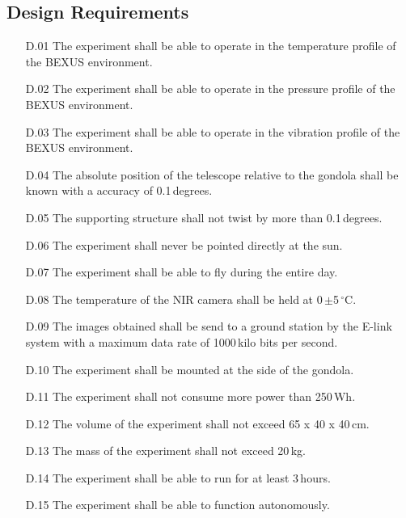 \subsection{Design Requirements}

\begin{enumerate}
	\item[D.01] The experiment shall be able to operate in the temperature profile of the BEXUS environment.
	\item[D.02] The experiment shall be able to operate in the pressure profile of the BEXUS environment.
    \item[D.03] The experiment shall be able to operate in the vibration profile of the BEXUS environment.
    \item[D.04] The absolute position of the telescope relative to the gondola shall be known with a accuracy of 0.1\,degrees.
	\item[D.05] The supporting structure shall not twist by more than 0.1\,degrees.
	\item[D.06] The experiment shall never be pointed directly at the sun.
	\item[D.07] The experiment shall be able to fly during the entire day.
	\item[D.08] The temperature of the NIR camera shall be held at 0\,$\pm$5\,$^\circ$C.
	\item[D.09] The images obtained shall be send to a ground station by the E-link system with a maximum data rate of 1000\,kilo bits per second.
	\item[D.10] The experiment shall be mounted at the side of the gondola.
	\item[D.11] The experiment shall not consume more power than 250\,Wh.
    \item[D.12] The volume of the experiment shall not exceed 65 x 40 x 40\,cm.
    \item[D.13] The mass of the experiment shall not exceed 20\,kg.
    \item[D.14] The experiment shall be able to run for at least 3\,hours.
    \item[D.15] The experiment shall be able to function autonomously.
\end{enumerate}